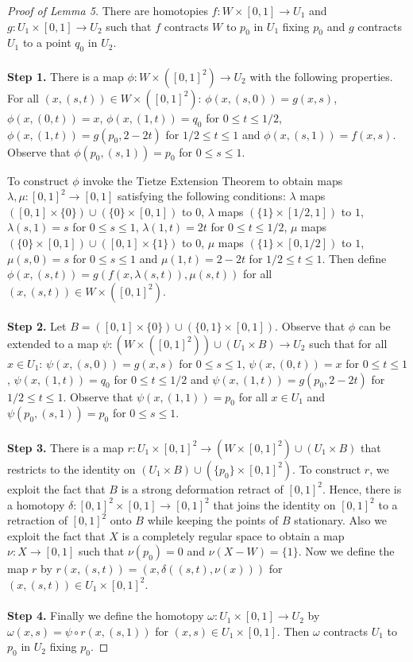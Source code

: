 \documentclass[12pt]{amsart}%
\theoremstyle{plain}
\numberwithin{equation}{section}
\begin{document}
\begin{proof}[Proof of Lemma 5]
There are homotopies $f : W \times [0,1] \rightarrow U_1$ and $g : U_1 \times [0,1] \rightarrow U_2$ such that $f$ contracts $W$ to $p_0$ in $U_1$ fixing $p_0$ and $g$ contracts $U_1$ to a point $q_0$ in $U_2$.
\\\\
\indent \textbf{Step 1.} There is a map $\phi : W \times ([0,1]^2) \rightarrow U_2$ with the following properties.  For all $(x,(s,t)) \in W \times ([0,1]^2)$: $\phi(x,(s,0)) = g(x,s)$, $\phi(x,(0,t)) = x$, $\phi(x,(1,t)) = q_0$ for $0 \leq t \leq 1/2$, $\phi(x,(1,t)) = g(p_0,2-2t)$ for $1/2 \leq t \leq 1$ and $\phi(x,(s,1)) = f(x,s)$.  Observe that $\phi(p_0,(s,1)) = p_0$ for $0 \leq s \leq 1$.

\indent To construct $\phi$ invoke the Tietze Extension Theorem to obtain maps $\lambda, \mu : [0,1]^2 \rightarrow [0,1]$ satisfying the following conditions: $\lambda$ maps $([0,1] \times \{0\}) \cup (\{0\} \times [0,1])$ to $0$, $\lambda$ maps $(\{1\} \times [1/2,1])$ to $1$, $\lambda(s,1) = s$ for $0 \leq s \leq 1$, $\lambda(1,t) = 2t$ for $0 \leq t \leq 1/2$, $\mu$ maps $(\{0\} \times [0,1]) \cup ([0,1] \times \{1\})$ to $0$, $\mu$ maps $(\{1\} \times [0,1/2])$ to $1$, $\mu(s,0) = s$ for $0 \leq s \leq 1$ and $\mu(1,t) = 2-2t$ for $1/2 \leq t \leq 1$. Then define $\phi(x,(s,t)) = g(f(x,\lambda(s,t)),\mu(s,t))$ for all $(x,(s,t)) \in W \times ([0,1]^2)$.
\\\\
\indent \textbf{Step 2.} Let $B = ([0,1] \times \{0\}) \cup (\{0,1\} \times [0,1])$. Observe that $\phi$ can be extended to a map $\psi : (W \times ([0,1]^2)) \cup (U_1 \times B) \rightarrow U_2$ such that for all $x \in U_1$: $\psi(x,(s,0)) = g(x,s)$ for $0 \leq s \leq 1$, $\psi(x,(0,t)) = x$ for $0 \leq t \leq 1$, $\psi(x,(1,t)) = q_0$ for $0 \leq t \leq 1/2$ and $\psi(x,(1,t)) = g(p_0,2-2t)$ for $1/2 \leq t \leq 1$. Observe that $\psi(x,(1,1)) = p_0$ for all $x \in U_1$ and $\psi(p_0,(s,1)) = p_0$ for $0 \leq s \leq 1$.
\\\\
\indent \textbf{Step 3.}  There is a map $r : U_1 \times [0,1]^2 \rightarrow (W \times [0,1]^2) \cup (U_1 \times B)$ that restricts to the identity on $(U_1 \times B) \cup (\{p_0\} \times [0,1]^2)$.  To construct $r$, we exploit the fact that $B$ is a strong deformation retract of $[0,1]^2$.  Hence, there is a homotopy $\delta : [0,1]^2 \times [0,1] \rightarrow [0,1]^2$ that joins the identity on $[0,1]^2$ to a retraction of $[0,1]^2$ onto $B$ while keeping the points of $B$ stationary. Also we exploit the fact that $X$ is a completely regular space to obtain a map $\nu : X \rightarrow [0,1]$ such that $\nu(p_0) = 0$ and $\nu(X-W) = \{1\}$.  Now we define the map $r$ by $r(x,(s,t)) = (x,\delta((s,t),\nu(x)))$ for $(x,(s,t)) \in U_1 \times [0,1]^2$.
\\\\
\indent \textbf{Step 4.} Finally we define the homotopy $\omega : U_1 \times [0,1] \rightarrow U_2$ by $\omega(x,s) = \psi\circ r(x,(s,1))$ for $(x,s) \in U_1 \times [0,1]$.  Then $\omega$ contracts $U_1$ to $p_0$ in $U_2$ fixing $p_0$.
\end{proof}
\end{document}
